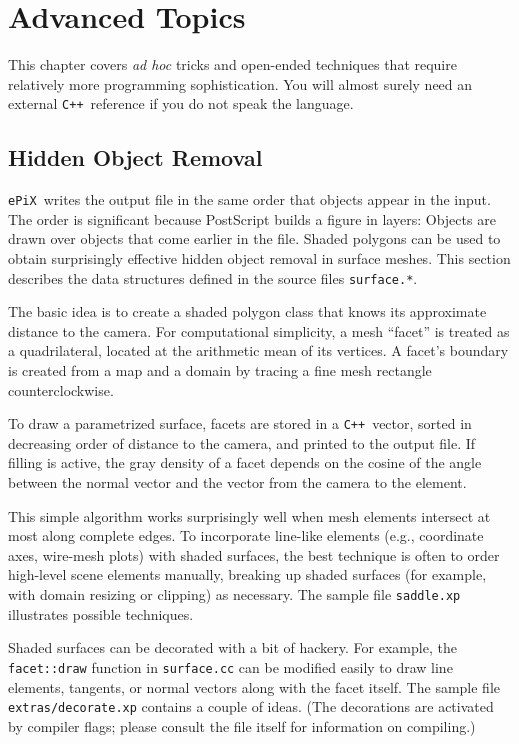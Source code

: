 \documentclass[12pt]{report}
\newcommand{\code}[1]{\texttt{#1}}
\newcommand{\filename}[1]{\texttt{#1}}
\newcommand{\ePiX}{\code{ePiX}}
\newcommand{\CXX}{\code{C++}}
\begin{document}
\chapter{Advanced Topics}
\label{chapter:adv}

This chapter covers \emph{ad hoc} tricks and open-ended techniques
that require relatively more programming sophistication. You will
almost surely need an external \CXX\ reference if you do not speak the
language.


\section{Hidden Object Removal}
\label{section:hidden}

\ePiX\ writes the output file in the same order that objects appear in
the input. The order is significant because PostScript builds a figure
in layers: Objects are drawn over objects that come earlier in the
file. Shaded polygons can be used to obtain surprisingly effective
hidden object removal in surface meshes. This section describes the
data structures defined in the source files \code{surface.*}.

The basic idea is to create a shaded polygon class that knows its
approximate distance to the camera. For computational
simplicity, a mesh ``facet'' is treated as a quadrilateral, located at
the arithmetic mean of its vertices. A facet's boundary is created
from a map and a domain by tracing a fine mesh rectangle
counterclockwise.

To draw a parametrized surface, facets are stored in a \CXX\ vector,
sorted in decreasing order of distance to the camera, and printed to
the output file. If filling is active, the gray density of a facet
depends on the cosine of the angle between the normal vector and the
vector from the camera to the element.

This simple algorithm works surprisingly well when mesh elements
intersect at most along complete edges. To incorporate line-like
elements (e.g., coordinate axes, wire-mesh plots) with shaded
surfaces, the best technique is often to order high-level scene
elements manually, breaking up shaded surfaces (for example, with
domain resizing or clipping) as necessary. The sample file
\filename{saddle.xp} illustrates possible techniques.

Shaded surfaces can be decorated with a bit of hackery. For example,
the \code{facet::draw} function in \filename{surface.cc} can be
modified easily to draw line elements, tangents, or normal vectors
along with the facet itself. The sample file
\filename{extras/decorate.xp} contains a couple of ideas. (The
decorations are activated by compiler flags; please consult the file
itself for information on compiling.)
\end{document}

